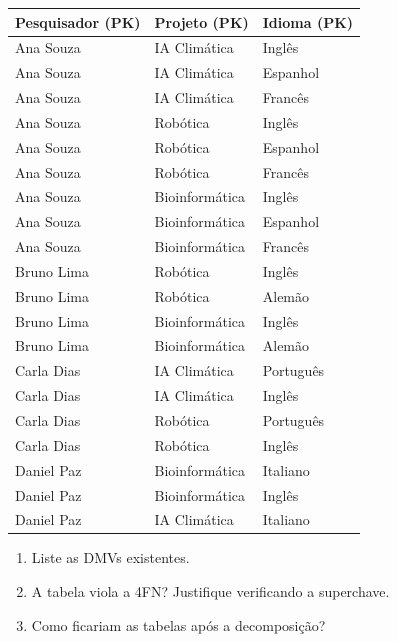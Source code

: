 \documentclass[12pt]{article}
\begin{document}
\begin{enumerate}[label=\textbf{Questão \arabic*:}, leftmargin=*]
  \vspace{0.2cm}
  \small
  \begin{tabular}{|l|l|l|}
    \hline
    \textbf{Pesquisador (PK)} & \textbf{Projeto (PK)} & \textbf{Idioma (PK)} \\ \hline
    Ana Souza  & IA Climática   & Inglês    \\ \hline
    Ana Souza  & IA Climática   & Espanhol  \\ \hline
    Ana Souza  & IA Climática   & Francês   \\ \hline
    Ana Souza  & Robótica       & Inglês    \\ \hline
    Ana Souza  & Robótica       & Espanhol  \\ \hline
    Ana Souza  & Robótica       & Francês   \\ \hline
    Ana Souza  & Bioinformática & Inglês    \\ \hline
    Ana Souza  & Bioinformática & Espanhol  \\ \hline
    Ana Souza  & Bioinformática & Francês   \\ \hline
    Bruno Lima & Robótica       & Inglês    \\ \hline
    Bruno Lima & Robótica       & Alemão    \\ \hline
    Bruno Lima & Bioinformática & Inglês    \\ \hline
    Bruno Lima & Bioinformática & Alemão    \\ \hline
    Carla Dias & IA Climática   & Português \\ \hline
    Carla Dias & IA Climática   & Inglês    \\ \hline
    Carla Dias & Robótica       & Português \\ \hline
    Carla Dias & Robótica       & Inglês    \\ \hline
    Daniel Paz & Bioinformática & Italiano  \\ \hline
    Daniel Paz & Bioinformática & Inglês    \\ \hline
    Daniel Paz & IA Climática   & Italiano  \\ \hline
  \end{tabular}
  \vspace{0.2cm}
  \begin{enumerate}[label=\alph*)]
    \item Liste as DMVs existentes.
    \item A tabela viola a 4FN? Justifique verificando a superchave.
    \item Como ficariam as tabelas após a decomposição?
  \end{enumerate}
  \begin{resposta}
  \end{resposta}


\end{enumerate}
\end{document}

